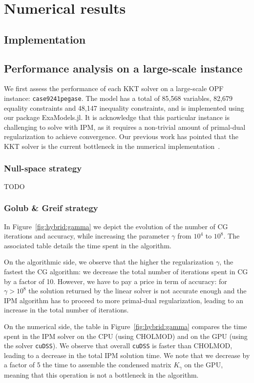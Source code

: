 \section{Numerical results}

\subsection{Implementation}

\subsection{Performance analysis on a large-scale instance}
We first assess the performance of each KKT solver
on a large-scale OPF instance: {\tt case9241pegase}. The model
has a total of 85,568 variables, 82,679 equality constraints and 48,147
inequality constraints, and is implemented using our package ExaModels.jl.
It is acknowledge that this particular instance is challenging to solve
with IPM, as it requires a non-trivial amount of primal-dual regularization
to achieve convergence.
Our previous work has pointed that the KKT solver is the current bottleneck
in the numerical implementation~\cite{shin2023accelerating}.

\subsubsection{Null-space strategy}
TODO

\subsubsection{Golub \& Greif strategy}
In Figure~\ref{fig:hybrid:gamma} we depict the evolution of the number
of CG iterations and accuracy, while increasing the parameter $\gamma$
from $10^4$ to $10^8$. The associated table details the time spent
in the algorithm.

On the algorithmic side, we observe that the higher the regularization $\gamma$,
the fastest the CG algorithm: we decrease the total number of iterations
spent in CG by a factor of 10. However, we have to pay a price in term
of accuracy: for $\gamma > 10^8$ the solution returned by the linear solver
is not accurate enough and the IPM algorithm has to proceed to more
primal-dual regularization, leading to an increase in the total number of iterations.

On the numerical side, the table in Figure~\ref{fig:hybrid:gamma} compares
the time spent in the IPM solver on the CPU (using CHOLMOD) and on the GPU
(using the solver {\tt cuDSS}). We observe that overall {\tt cuDSS} is
faster than CHOLMOD, leading to a decrease in the total IPM solution time.
We note that we decrease by a factor of 5 the time to assemble the condensed
matrix $K_\gamma$ on the GPU, meaning that this operation is not a bottleneck in
the algorithm.

